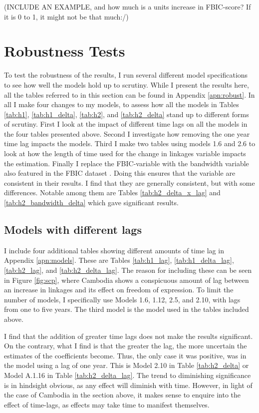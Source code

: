 (INCLUDE AN EXAMPLE, and how much is a units increase in FBIC-score? If it is 0 to 1, it might not be that much:/)

\section{Robustness Tests} \label{sec:robust}
To test the robustness of the results, I run several different model specifications to see how well the models hold up to scrutiny. While I present the results here, all the tables referred to in this section can be found in Appendix \ref{apn:robust}. In all I make four changes to my models, to assess how all the models in Tables \ref{tab:h1}, \ref{tab:h1_delta}, \ref{tab:h2}, and \ref{tab:h2_delta} stand up to different forms of scrutiny. First I look at the impact of different time lags on all the models in the four tables presented above. Second I investigate how removing the one year time lag impacts the models. Third I make two tables using models 1.6 and 2.6 to look at how the length of time used for the change in linkages variable impacts the estimation. Finally I replace the FBIC-variable with the bandwidth variable also featured in the FBIC dataset \citep{moyer_china-us_2021}. Doing this ensures that the variable are consistent in their results. I find that they are generally consistent, but with some differences. Notable among them are Tables \ref{tab:h2_delta_x_lag} and \ref{tab:h2_bandwidth_delta} which gave significant results.

\subsection{Models with different lags}
I include four additional tables showing different amounts of time lag in Appendix \ref{apn:models}. These are Tables \ref{tab:h1_lag}, \ref{tab:h1_delta_lag}, \ref{tab:h2_lag}, and \ref{tab:h2_delta_lag}. The reason for including these can be seen in Figure \ref{fig:scp}, where Cambodia shows a conspicuous amount of lag between an increase in linkages and its effect on freedom of expression. To limit the number of models, I specifically use Models 1.6, 1.12, 2.5, and 2.10, with lags from one to five years. The third model is the model used in the tables included above. 

I find that the addition of greater time lags does not make the results significant. On the contrary, what I find is that the greater the lag, the more uncertain the estimates of the coefficients become. Thus, the only case it was positive, was in the model using a lag of one year. This is Model 2.10 in Table \ref{tab:h2_delta} or Model A.1.16 in Table \ref{tab:h2_delta_lag}. The trend to diminishing significance  is in hindsight obvious, as any effect will diminish with time. However, in light of the case of Cambodia in the section above, it makes sense to enquire into the effect of time-lags, as effects may take time to manifest themselves.

